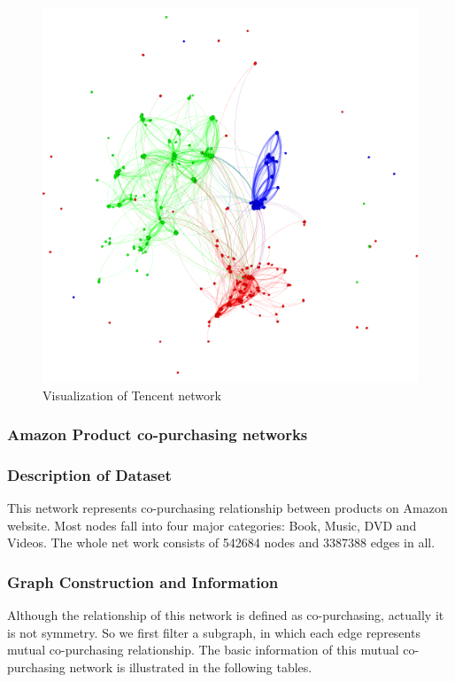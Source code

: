 \begin{figure}[!ht]
	\centering
	\begin{minipage}[b]{0.5\linewidth}
	\centering
	\includegraphics[width=\textwidth]{FIG/tencent.png}
	\caption{Visualization of Tencent network}
	\label{fig:figure2}
	\end{minipage}
\end{figure}

\subsubsection{Amazon Product co-purchasing networks}

\subsubsection*{Description of Dataset}
This network represents co-purchasing relationship between products on Amazon website. Most nodes fall into four major categories: Book, Music, DVD and Videos. The whole net work consists of 542684 nodes and 3387388 edges in all.


\subsubsection*{Graph Construction and Information}
Although the relationship of this network is defined as co-purchasing, actually it is not symmetry. So we first filter a subgraph, in which each edge represents mutual co-purchasing relationship. The basic information of this mutual co-purchasing network is illustrated in the following tables. 

